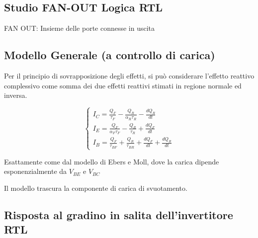\documentclass{article}
\begin{document}
\subsection{Studio FAN-OUT Logica RTL}
FAN OUT: Insieme delle porte connesse in uscita

\subsection{Modello Generale (a controllo di carica)}
Per il principio di sovrapposizione degli effetti, si può considerare l'effetto reattivo complessivo come somma dei due effetti reattivi stimati in regione normale ed inversa.

\begin{minipage}{0.5\textwidth}
\begin{center}
\end{center}
\end{minipage}
\begin{minipage}{0.5\textwidth}
\[
    \begin{cases}
        I_C = \frac{Q_F}{\tau_F} -\frac{Q_R}{\alpha_R \tau_R} - \frac{dQ_R}{dt}\\
        I_E = \frac{Q_F}{\alpha_F \tau_F}  - \frac{Q_R}{\tau_R} + \frac{dQ_F}{dt}\\
        I_B = \frac{Q_F}{\tau_{BF}} + \frac{Q_R}{\tau_{BR}} + \frac{dQ_F}{dt} + \frac{dQ_R}{dt}
    \end{cases}
\]
\end{minipage}

\bigbreak%
Esattamente come dal modello di Ebers e Moll, dove la carica dipende esponenzialmente da $V_{BE}$ e $V_{BC}$


Il modello trascura la componente di carica di svuotamento.

\subsection{Risposta al gradino in salita dell'invertitore RTL}
\end{document}
